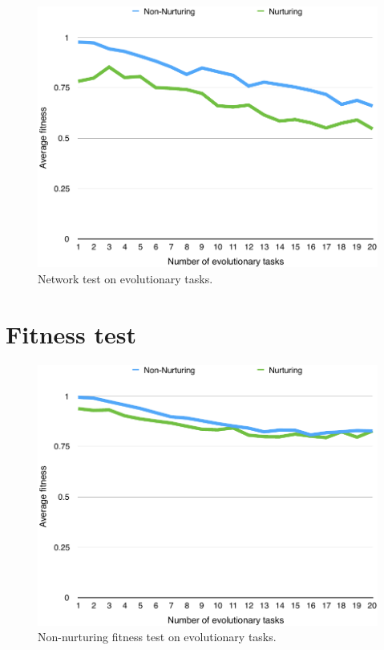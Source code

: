\documentclass[master]{outhesis}
\begin{document}
\begin{figure}[H]
	\centering
	\includegraphics{NetworkTestPlot.pdf}
	\caption{Network test on evolutionary tasks.}
\end{figure}

\section{Fitness test}

\begin{figure}[H]
	\centering
	\includegraphics{NonNurturingFitnessTestPlot.pdf}
	\caption{Non-nurturing fitness test on evolutionary tasks.}
\end{figure}
\end{document}
